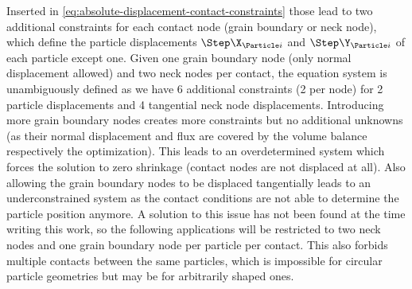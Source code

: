 Inserted in \cref{eq:absolute-displacement-contact-constraints} those lead to two additional constraints for each contact node (grain boundary or neck node), which define the particle displacements $\Step\X_{\Particle i}$ and $\Step\Y_{\Particle i}$ of each particle except one.
Given one grain boundary node (only normal displacement allowed) and two neck nodes per contact, the equation system is unambiguously defined as we have 6 additional constraints (2 per node) for 2 particle displacements and 4 tangential neck node displacements.
Introducing more grain boundary nodes creates more constraints but no additional unknowns (as their normal displacement and flux are covered by the volume balance respectively the optimization).
This leads to an overdetermined system which forces the solution to zero shrinkage (contact nodes are not displaced at all).
Also allowing the grain boundary nodes to be displaced tangentially leads to an underconstrained system as the contact conditions are not able to determine the particle position anymore.
A solution to this issue has not been found at the time writing this work, so the following applications will be restricted to two neck nodes and one grain boundary node per particle per contact.
This also forbids multiple contacts between the same particles, which is impossible for circular particle geometries but may be for arbitrarily shaped ones.
